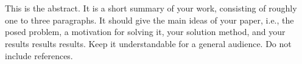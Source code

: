 \chapter{\abstractname}
This is the abstract.
It is a short summary of your work, consisting of roughly one to three paragraphs.
It should give the main ideas of your paper, i.e., the posed problem, a motivation for solving it, your solution method, and your results results
results.
Keep it understandable for a general audience.
Do not include references.
